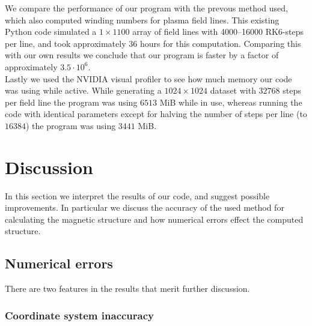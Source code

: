 \documentclass[a4paper]{article}
\begin{document}

We compare the performance of our program with the prevous method used, which also computed winding numbers for plasma field lines.
This existing Python code simulated a $1\times 1100$ array of field lines with 4000--16000 RK6-steps per line, and took approximately $36$ hours for this computation. 
Comparing this with our own results we conclude that our program is faster by a factor of approximately $3.5\cdot 10^6$.\\

Lastly we used the NVIDIA visual profiler to see how much memory our code was using while active. 
While generating a $1024\times 1024$ dataset with $32768$ steps per field line the program was using $6513$ MiB while in use, whereas running the code with identical parameters except for halving the number of steps per line (to $16384$) the program was using $3441$ MiB.


\section{Discussion}
In this section we interpret the results of our code, and suggest possible improvements. 
In particular we discuss the accuracy of the used method for calculating the magnetic structure and how numerical errors effect the computed structure.

\subsection{Numerical errors}\label{section:numerrors}
There are two features in the results that merit further discussion. 

\subsubsection{Coordinate system inaccuracy}
\end{document}
